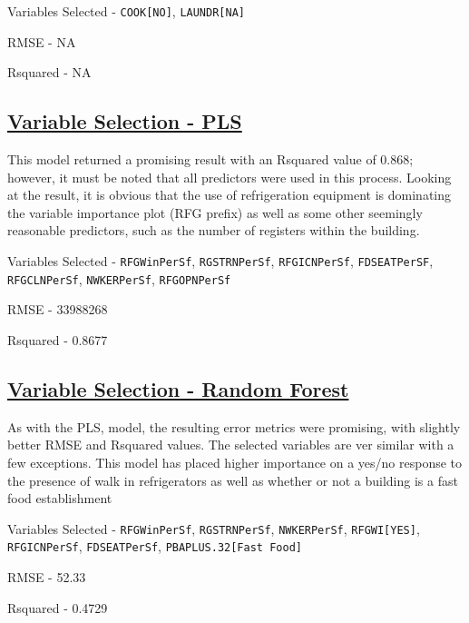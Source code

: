 \begin{myitemize}
\item Variables Selected - \lstinline{COOK[NO]}, \lstinline{LAUNDR[NA]}
\item RMSE - NA
\item Rsquared - NA
\end{myitemize}

\subsection{\hyperref[appendix:electricity:pls]{Variable Selection - PLS}}

This model returned a promising result with an Rsquared value of 0.868; however, it must be noted that all predictors were used in this process.  Looking at the result, it is obvious that the use of refrigeration equipment is dominating the variable importance plot (RFG prefix) as well as some other seemingly reasonable predictors, such as the number of registers within the building.  

\begin{myitemize}
\item Variables Selected - \lstinline{RFGWinPerSf}, \lstinline{RGSTRNPerSf}, \lstinline{RFGICNPerSf}, \lstinline{FDSEATPerSF}, \lstinline{RFGCLNPerSf}, \lstinline{NWKERPerSf}, \lstinline{RFGOPNPerSf}
\item RMSE - 33988268
\item Rsquared - 0.8677
\end{myitemize}

\subsection{\hyperref[appendix:electricity:rf]{Variable Selection - Random Forest}}

As with the PLS, model, the resulting error metrics were promising, with slightly better RMSE and Rsquared values.  The selected variables are ver similar with a few exceptions.  This model has placed higher importance on a yes/no response to the presence of walk in refrigerators as well as whether or not a building is a fast food establishment

\begin{myitemize}
\item Variables Selected - \lstinline{RFGWinPerSf}, \lstinline{RGSTRNPerSf}, \lstinline{NWKERPerSf}, \lstinline{RFGWI[YES]}, \lstinline{RFGICNPerSf}, \lstinline{FDSEATPerSf}, \lstinline{PBAPLUS.32[Fast Food]}
\item RMSE - 52.33
\item Rsquared - 0.4729
\end{myitemize}

